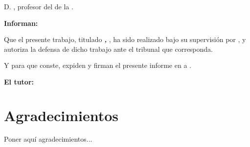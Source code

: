 D. \textbf{\myProf}, profesor del \myDepartment de la \myUni.

\vspace{0.5cm}

\textbf{Informan:}

\vspace{0.5cm}

Que el presente trabajo, titulado \textit{\textbf{\myTitle, \mySubTitle}}, ha sido realizado bajo su supervisión por \textbf{\myName}, y autoriza la defensa de dicho trabajo ante el tribunal que corresponda.

\vspace{0.5cm}

Y para que conste, expiden y firman el presente informe en \myLocation a \myTime.

\vspace{1cm}

\textbf{El tutor:}

\vspace{5cm}

\noindent \textbf{\myProf}

\chapter*{Agradecimientos}
\thispagestyle{empty}

       \vspace{1cm}


Poner aquí agradecimientos...

